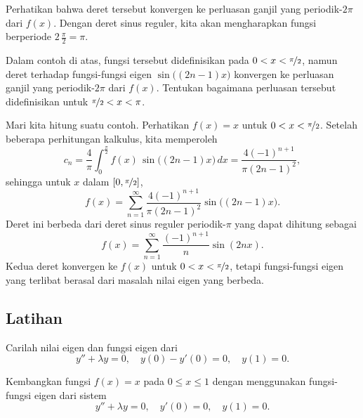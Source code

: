 \begin{example}
Perhatikan bahwa deret tersebut konvergen ke perluasan ganjil yang periodik-$2\pi$
dari $f(x)$.  Dengan deret sinus reguler, kita akan mengharapkan
fungsi berperiode $2 \, \frac{\pi}{2} = \pi$.

\begin{exercise}[menantang]
Dalam contoh di atas, fungsi tersebut didefinisikan pada $0 < x < \nicefrac{\pi}{2}$,
namun deret terhadap fungsi-fungsi eigen
$\sin \bigl( (2n-1)x \bigr)$ konvergen ke perluasan ganjil yang periodik-$2\pi$ dari $f(x)$.
Tentukan bagaimana perluasan tersebut didefinisikan untuk $\nicefrac{\pi}{2} < x < \pi$.
\end{exercise}

Mari kita hitung suatu contoh.
Perhatikan $f(x) = x$ untuk $0 < x <  \nicefrac{\pi}{2}$.  Setelah beberapa
perhitungan kalkulus, kita memperoleh
\begin{equation*}
c_n = 
\frac{4}{\pi} \int_0^{\frac{\pi}{2}} f(x) \,\sin \bigl( (2n-1)x \bigr) \, dx 
=
\frac{4{(-1)}^{n+1}}{\pi {(2n-1)}^2} ,
\end{equation*}
sehingga untuk $x$ dalam $[0,\nicefrac{\pi}{2}]$,
\begin{equation*}
f(x) = \sum_{n=1}^\infty \frac{4{(-1)}^{n+1}}{\pi {(2n-1)}^2}
\sin \bigl( (2n-1)x \bigr) .
\end{equation*}
Deret ini berbeda dari deret sinus reguler periodik-$\pi$ yang dapat
dihitung sebagai
\begin{equation*}
f(x) = \sum_{n=1}^\infty \frac{{(-1)}^{n+1}}{n}  \sin ( 2nx ) .
\end{equation*}
Kedua deret konvergen ke $f(x)$ untuk $0 < x < \nicefrac{\pi}{2}$, tetapi
fungsi-fungsi eigen yang terlibat berasal dari masalah nilai eigen yang berbeda.
\end{example}

\subsection{Latihan}

\begin{exercise}
Carilah nilai eigen dan fungsi eigen dari
\begin{equation*}
y''+\lambda y = 0, \quad y(0)- y'(0) = 0, \quad y(1) = 0 .
\end{equation*}
\end{exercise}

\begin{exercise}
Kembangkan fungsi $f(x) = x$ pada $0 \leq x \leq 1$ dengan menggunakan fungsi-fungsi eigen
dari sistem
\begin{equation*}
y'' + \lambda y = 0, \quad y'(0) = 0, \quad y(1) = 0 .
\end{equation*}
\end{exercise}

